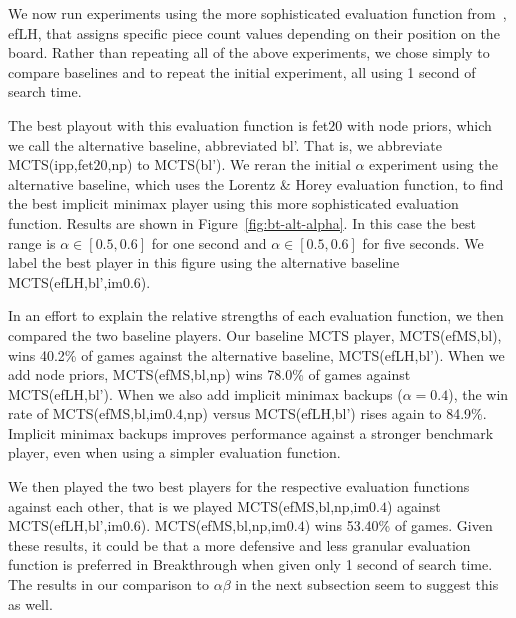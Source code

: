 \documentclass[conference]{IEEEtran}
\begin{document}

\vspace{0.05cm} %

We now run experiments using the more sophisticated evaluation function from~\cite{Lorentz13Breakthrough}, 
efLH, that assigns specific piece count values depending on their position on the board. 
Rather than repeating all of the above experiments, we chose simply to compare baselines and to repeat
the initial experiment, all using 1 second of search time.

The best playout with this evaluation function is fet$20$ with node priors, which we call the alternative baseline, 
abbreviated bl'.
That is, we abbreviate MCTS(ipp,fet$20$,np) to MCTS(bl').
We reran the initial $\alpha$ experiment using the alternative baseline, 
which uses the Lorentz \& Horey evaluation function, to find the best implicit minimax player using this 
more sophisticated evaluation function. Results are shown in Figure~\ref{fig:bt-alt-alpha}. 
In this case the best range is $\alpha \in [0.5,0.6]$ for one second and $\alpha \in [0.5,0.6]$ for
five seconds.
We label the best player in this figure using the alternative baseline MCTS(efLH,bl',im$0.6$). 

In an effort to explain the relative strengths of each evaluation function, we then compared the two baseline players. 
Our baseline MCTS player, MCTS(efMS,bl), wins 40.2\% of games against the alternative baseline, MCTS(efLH,bl'). 
When we add node priors, MCTS(efMS,bl,np) wins 78.0\% of games against MCTS(efLH,bl'). 
When we also add implicit minimax backups ($\alpha = 0.4$), the win rate of MCTS(efMS,bl,im$0.4$,np) versus MCTS(efLH,bl') rises again to 84.9\%. 
Implicit minimax backups improves performance against a stronger benchmark player, even when using a simpler evaluation function. 

We then played the two best players for the respective evaluation functions against each other, 
that is we played MCTS(efMS,bl,np,im$0.4$) against MCTS(efLH,bl',im$0.6$). 
MCTS(efMS,bl,np,im$0.4$) wins 53.40\% of games. 
Given these results, it could be that a more defensive and less granular evaluation function is preferred 
in Breakthrough when given only 1 second of search time. 
The results in our comparison to $\alpha\beta$ in the next subsection seem to suggest this as well.
\end{document}
